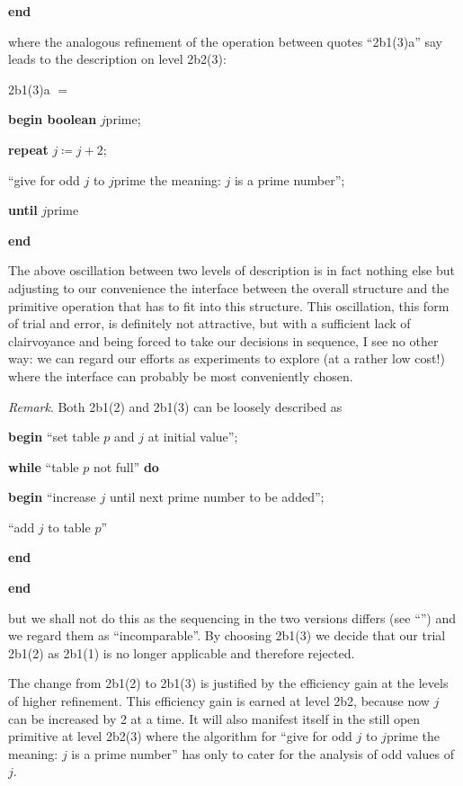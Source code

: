 \noindent
\textbf{end}

\noindent
where the analogous refinement of the operation between quotes \textemdash{}  ``2b1(3)a'' say \textemdash{}  leads to the description on level 2b2(3):

\noindent
2b1(3)a $=$

\noindent
\textbf{begin boolean} $j$prime;

\noindent
\quad\textbf{repeat} $j \coloneq j + 2;$

\noindent
\quad\quad``give for odd $j$ to $j$prime the meaning: $j$ is a prime number'';

\noindent
\quad\textbf{until} $j$prime

\noindent
\textbf{end}

The above oscillation between two levels of description is in fact nothing else but adjusting to our convenience the interface between the overall structure and the primitive operation that has to fit into this structure. This oscillation, this form of trial and error, is definitely not attractive, but with a sufficient lack of clairvoyance and being forced to take our decisions in
sequence, I see no other way: we can regard our efforts as experiments to explore (at a rather low cost!) where the interface can probably be most conveniently chosen.

\noindent
\textit{Remark}. Both 2b1(2) and 2b1(3) can be loosely described as

\noindent
\textbf{begin} ``set table $p$ and $j$ at initial value'';

\noindent
\quad\textbf{while} ``table $p$ not full'' \textbf{do}

\noindent
\quad\textbf{begin} ``increase $j$ until next prime number to be added'';

\noindent
\quad\quad ``add $j$ to table $p$''

\noindent
\quad\textbf{end}

\noindent
\textbf{end}

\noindent
but we shall not do this as the sequencing in the two versions differs (see ``'') and we regard them as ``incomparable''. By choosing 2b1(3) we decide that our trial 2b1(2) \textemdash{}  as 2b1(1) \textemdash{}  is no longer applicable and therefore rejected.

The change from 2b1(2) to 2b1(3) is justified by the efficiency gain at the levels of higher refinement. This efficiency gain is earned at level 2b2, because now $j$ can be increased by 2 at a time. It will also manifest itself in the still open primitive at level 2b2(3) where the algorithm for ``give for odd $j$ to $j$prime the meaning: $j$ is a prime number'' has only to cater for the analysis of odd values of $j$.

